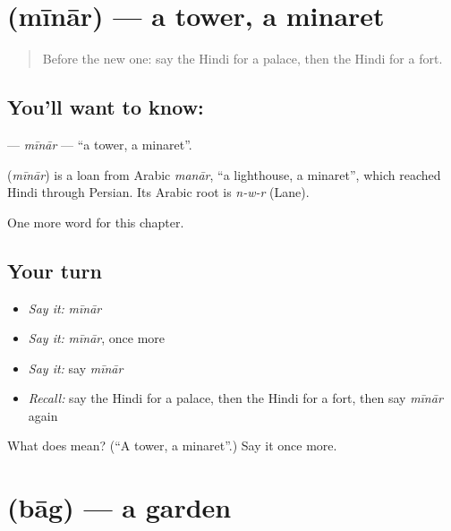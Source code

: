 \section[\texorpdfstring{\hi{मीनार} (mīnār)}{मीनार (mīnār)}]{ (mīnār) — a tower, a minaret}

\label{lesson:HI-C202-minar}



\begin{quote}
Before the new one: say the Hindi for a palace, then the Hindi for a fort.
\end{quote}

\subsection*{You'll want to know: }
\textbf{} — \emph{mīnār} — \textquotedblleft{}a tower, a minaret\textquotedblright{}.

\begin{cousinweb}
\textbf{} (\emph{mīnār}) is a loan from Arabic \emph{manār}, \textquotedblleft{}a lighthouse, a minaret\textquotedblright{}, which reached Hindi through Persian. Its Arabic root is \emph{n-w-r} (Lane).
\end{cousinweb}

\begin{grammarlens}[title={What you've built}]
One more word for this chapter.
\end{grammarlens}

\subsection*{Your turn}
\begin{itemize}
\raggedright
  \item \emph{Say it:} \emph{mīnār}
  \item \emph{Say it:} \emph{mīnār}, once more
  \item \emph{Say it:} say \emph{mīnār}
  \item \emph{Recall:} say the Hindi for a palace, then the Hindi for a fort, then say \emph{mīnār} again
\end{itemize}

\begin{tcolorbox}[breakable,colback=teal!4,colframe=teal!35!black,title={Before you move on}]
What does  mean? (\textquotedblleft{}A tower, a minaret\textquotedblright{}.) Say it once more.
\end{tcolorbox}
\section[\texorpdfstring{\hi{बाग़} (bāg)}{बाग़ (bāg)}]{ (bāg) — a garden}

